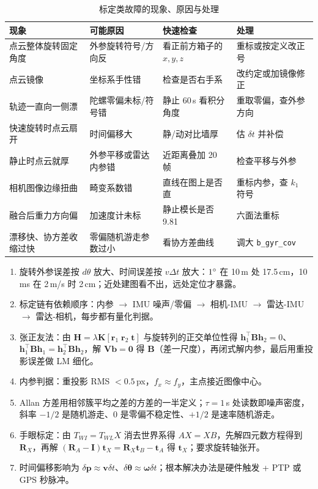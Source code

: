 \begin{table}[htbp]
  \centering
  \caption{标定类故障的现象、原因与处理}\label{tab:26-errors}
  \footnotesize
  \begin{tabular}{p{2.9cm}p{3.5cm}p{3.2cm}p{4.5cm}}
    \toprule
    现象 & 可能原因 & 快速检查 & 处理 \\
    \midrule
    点云整体旋转固定角度 & 外参旋转符号/方向反 & 看正前方箱子的 $x,y,z$ & 重标或按定义改正号 \\
    点云镜像 & 坐标系手性错 & 检查是否右手系 & 改约定或加镜像修正 \\
    轨迹一直向一侧漂 & 陀螺零偏未标/符号错 & 静止 60\,s 看积分角度 & 重取零偏，查外参方向 \\
    快速旋转时点云扇开 & 时间偏移大 & 静/动对比墙厚 & 估 $\delta t$ 并补偿 \\
    静止时点云就厚 & 外参平移或雷达内参错 & 近距离叠加 20 帧 & 检查平移与外参 \\
    相机图像边缘扭曲 & 畸变系数错 & 直线在图上是否直 & 重标内参，查 $k_1$ 符号 \\
    融合后重力方向偏 & 加速度计未标 & 静止模长是否 9.81 & 六面法重标 \\
    漂移快、协方差收缩过快 & 零偏随机游走参数过小 & 看协方差曲线 & 调大 \lstinline{b_gyr_cov} \\
    \bottomrule
  \end{tabular}
\end{table}

\begin{summary}

\begin{enumerate}
  \item 旋转外参误差按 $d\theta$ 放大、时间误差按 $v\Delta t$ 放大：$1^\circ$ 在 10\,m 处 17.5\,cm，10\,ms 在 2\,m/s 时 2\,cm；近处建图看不出，远处定位才暴露。
  \item 标定链有依赖顺序：内参 $\to$ IMU 噪声/零偏 $\to$ 相机-IMU $\to$ 雷达-IMU $\to$ 雷达-相机，每步都有量化判据。
  \item 张正友法：由 $\bm{H}=\lambda\bm{K}[\bm{r}_1\;\bm{r}_2\;\bm{t}]$ 与旋转列的正交单位性得 $\bm{h}_1^{\top}\bm{B}\bm{h}_2=0$、$\bm{h}_1^{\top}\bm{B}\bm{h}_1=\bm{h}_2^{\top}\bm{B}\bm{h}_2$，解 $\bm{V}\bm{b}=\bm{0}$ 得 $\bm{B}$（差一尺度），再闭式解内参，最后用重投影误差做 LM 细化。
  \item 内参判据：重投影 RMS $<0.5$\,px，$f_x\approx f_y$，主点接近图像中心。
  \item Allan 方差用相邻簇平均之差的方差的一半定义；$\tau=1$\,s 处读数即噪声密度，斜率 $-1/2$ 是随机游走、$0$ 是零偏不稳定性、$+1/2$ 是速率随机游走。
  \item 手眼标定：由 $T_{WI}=T_{WL}X$ 消去世界系得 $AX=XB$，先解四元数方程得到 $\bm{R}_X$，再解 $(\bm{R}_A-\bm{I})\bm{t}_X=\bm{R}_X\bm{t}_B-\bm{t}_A$ 得 $\bm{t}_X$；要求旋转轴张开。
  \item 时间偏移影响为 $\delta\bm{p}\approx\bm{v}\delta t$、$\delta\bm{\theta}\approx\bm{\omega}\delta t$；根本解决办法是硬件触发 + PTP 或 GPS 秒脉冲。
\end{enumerate}


\end{summary}

